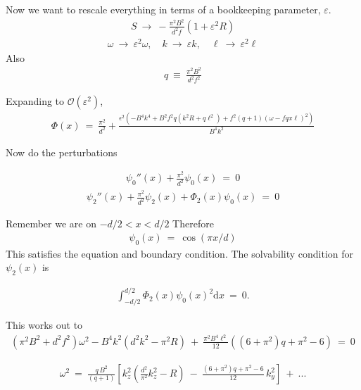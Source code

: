\documentclass[aps,prl,preprint
,superscriptaddress]{revtex4-1}\newcommand{\SSC}{S/S_{c}}
\newcommand\Beq{\begin{eqnarray}}
\newcommand\Eeq{\end{eqnarray}}
\newcommand{\eps}{\varepsilon}
\begin{document}
Now we want to rescale everything in terms of a bookkeeping parameter, $\eps$.
\Beq
S  \ \to \  - \frac{\pi ^2 B^2}{d^2 f} ( 1 + \eps^{2} R) 
\Eeq 
\Beq
\omega \ \to \ \eps^{2} \omega , \quad k \ \to \ \eps k, \quad \ell \ \to \ \eps^{2} \ell 
\Eeq
Also 
\Beq
q  \ \equiv  \ \frac{\pi ^2 B^2}{d^2 f^{2}}
\Eeq

Expanding to $\mathcal{O}(\eps^{2})$, 
\Beq
\Phi(x) \ = \ \frac{\pi^{2}}{d^{2}} + \frac{\epsilon ^2 \left(-B^4 k^4+B^2 f^2 q \left(k^2 R+q
   \ell ^2\right)+f^2 (q+1) (\omega -f q x \ell
   )^2\right)}{B^4 k^2}
\Eeq

Now do the perturbations 

\Beq
\psi_{0}''(x) + \frac{\pi^{2}}{d^{2}}  \psi_{0}(x) \ = \ 0 
\Eeq
\Beq
\psi_{2}''(x) + \frac{\pi^{2}}{d^{2}}  \psi_{2}(x) + \Phi_{2}(x)\psi_{0}(x)\ = \ 0 
\Eeq

Remember we are on $-d/2 < x < d/2$ Therefore 
\Beq
\psi_{0}(x) \ = \ \cos(\pi x / d)
\Eeq
This satisfies the equation and boundary condition. The solvability condition for $\psi_{2}(x)$ is 

\Beq
\int_{-d/2}^{d/2} \Phi_{2}(x)\psi_{0}(x)^{2} \text{d} x \ = \ 0.
\Eeq


This works out to 
\Beq
\left(\pi ^2 B^2+d^2 f^2 \right) \omega^{2} - B^4 k^2 \left(d^2 k^2-\pi ^2 R\right)   \ + \ \frac{\pi ^2 B^4 \ell ^2}{12}  \left(\left(6+\pi ^2\right) q+\pi ^2-6\right) \ = \ 0
\Eeq



\Beq
\omega^{2} \ = \ \frac{q\,B^{2}}{(q+1)} \left[ k_z^2 \left(\frac{d^2}{\pi^{2}} k_z^2-R\right) \ - \ \frac{\left(6+\pi ^2\right) q+\pi
   ^2-6}{12 } \, k_{y}^{2}  \right] \ + \ ...
\Eeq
\end{document}
